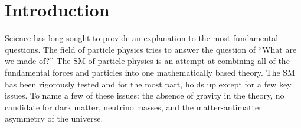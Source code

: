 \chapter{Introduction}\label{chap:Intro}
	Science has long sought to provide an explanation to the most fundamental questions. The field of particle physics tries to answer  the question of ``What are we made of?'' The \acrfull{SM} of particle physics is an attempt at combining all of the fundamental forces and particles into one mathematically based theory. The \gls{SM} has been rigorously tested and for the most part, holds up except for a few key issues. To name a few of these issues: the absence of gravity in the theory, no candidate for dark matter, neutrino masses, and the matter-antimatter asymmetry of the universe. 
